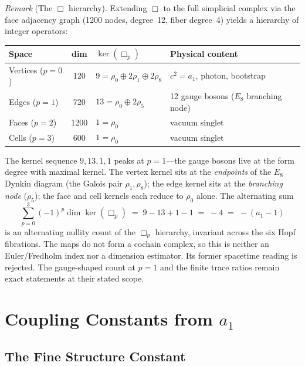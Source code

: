 \documentclass[12pt,a4paper]{article}
\theoremstyle{definition}
\begin{document}
\noindent\textit{Remark} (The $\Box$ hierarchy).  Extending $\Box$ to the full simplicial complex via the face adjacency graph (1200 nodes, degree~12, fiber degree~4) yields a hierarchy of integer operators:
\begin{center}\small
\begin{tabular}{lcll}
\toprule
\textbf{Space} & \textbf{dim} & \textbf{$\ker(\Box_p)$} & \textbf{Physical content}\\
\midrule
Vertices ($p=0$) & 120 & $9 = \rho_0 \oplus 2\rho_1 \oplus 2\rho_8$ & $c^2 = a_1$, photon, bootstrap \\
Edges ($p=1$) & 720 & $13 = \rho_0 \oplus 2\rho_5$ & 12 gauge bosons ($E_8$ branching node) \\
Faces ($p=2$) & 1200 & $1 = \rho_0$ & vacuum singlet \\
Cells ($p=3$) & 600 & $1 = \rho_0$ & vacuum singlet \\
\bottomrule
\end{tabular}
\end{center}
The kernel sequence $9, 13, 1, 1$ peaks at $p = 1$---the gauge bosons live at the form degree with maximal kernel.  The vertex kernel sits at the \emph{endpoints} of the $E_8$ Dynkin diagram (the Galois pair $\rho_1, \rho_8$); the edge kernel sits at the \emph{branching node} ($\rho_5$); the face and cell kernels each reduce to $\rho_0$ alone.  The alternating sum
\[
\boxed{\sum_{p=0}^{3} (-1)^p \dim\ker(\Box_p) \;=\; 9 - 13 + 1 - 1 \;=\; -4 \;=\; -(a_1 - 1)}
\]
is an alternating nullity count of the $\Box_p$ hierarchy, invariant across
the six Hopf fibrations.  The maps do not form a cochain complex, so this is
neither an Euler/Fredholm index nor a dimension estimator.  Its former
spacetime reading is rejected.  The gauge-shaped count at $p=1$ and the
finite trace ratios remain exact statements at their stated scope.


\section{Coupling Constants from \texorpdfstring{$a_1$}{a1}}
\label{sec:coupling}

\subsection{The Fine Structure Constant}
\end{document}
